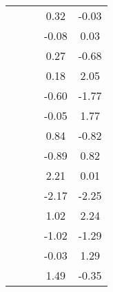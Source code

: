 \begin{table}
\begin{tabular}{c|cc|cc|}
\multicolumn{1}{|c|}{} & \multicolumn{1}{|c|}{} & \multicolumn{1}{|c|}{} & \multicolumn{1}{|c|}{      0.32} & \multicolumn{1}{|c|}{     -0.03} \\ 
\multicolumn{1}{|c|}{} & \multicolumn{1}{|c|}{} & \multicolumn{1}{|c|}{} & \multicolumn{1}{|c|}{     -0.08} & \multicolumn{1}{|c|}{      0.03} \\ 
\multicolumn{1}{|c|}{} & \multicolumn{1}{|c|}{} & \multicolumn{1}{|c|}{} & \multicolumn{1}{|c|}{      0.27} & \multicolumn{1}{|c|}{     -0.68} \\ 
\multicolumn{1}{|c|}{} & \multicolumn{1}{|c|}{} & \multicolumn{1}{|c|}{} & \multicolumn{1}{|c|}{      0.18} & \multicolumn{1}{|c|}{      2.05} \\ 
\multicolumn{1}{|c|}{} & \multicolumn{1}{|c|}{} & \multicolumn{1}{|c|}{} & \multicolumn{1}{|c|}{     -0.60} & \multicolumn{1}{|c|}{     -1.77} \\ 
\multicolumn{1}{|c|}{} & \multicolumn{1}{|c|}{} & \multicolumn{1}{|c|}{} & \multicolumn{1}{|c|}{     -0.05} & \multicolumn{1}{|c|}{      1.77} \\ 
\multicolumn{1}{|c|}{} & \multicolumn{1}{|c|}{} & \multicolumn{1}{|c|}{} & \multicolumn{1}{|c|}{      0.84} & \multicolumn{1}{|c|}{     -0.82} \\ 
\multicolumn{1}{|c|}{} & \multicolumn{1}{|c|}{} & \multicolumn{1}{|c|}{} & \multicolumn{1}{|c|}{     -0.89} & \multicolumn{1}{|c|}{      0.82} \\ 
\multicolumn{1}{|c|}{} & \multicolumn{1}{|c|}{} & \multicolumn{1}{|c|}{} & \multicolumn{1}{|c|}{      2.21} & \multicolumn{1}{|c|}{      0.01} \\ 
\multicolumn{1}{|c|}{} & \multicolumn{1}{|c|}{} & \multicolumn{1}{|c|}{} & \multicolumn{1}{|c|}{     -2.17} & \multicolumn{1}{|c|}{     -2.25} \\ 
\multicolumn{1}{|c|}{} & \multicolumn{1}{|c|}{} & \multicolumn{1}{|c|}{} & \multicolumn{1}{|c|}{      1.02} & \multicolumn{1}{|c|}{      2.24} \\ 
\multicolumn{1}{|c|}{} & \multicolumn{1}{|c|}{} & \multicolumn{1}{|c|}{} & \multicolumn{1}{|c|}{     -1.02} & \multicolumn{1}{|c|}{     -1.29} \\ 
\multicolumn{1}{|c|}{} & \multicolumn{1}{|c|}{} & \multicolumn{1}{|c|}{} & \multicolumn{1}{|c|}{     -0.03} & \multicolumn{1}{|c|}{      1.29} \\ 
\multicolumn{1}{|c|}{} & \multicolumn{1}{|c|}{} & \multicolumn{1}{|c|}{} & \multicolumn{1}{|c|}{      1.49} & \multicolumn{1}{|c|}{     -0.35} \\ 

\end{tabular}
\end{table}
